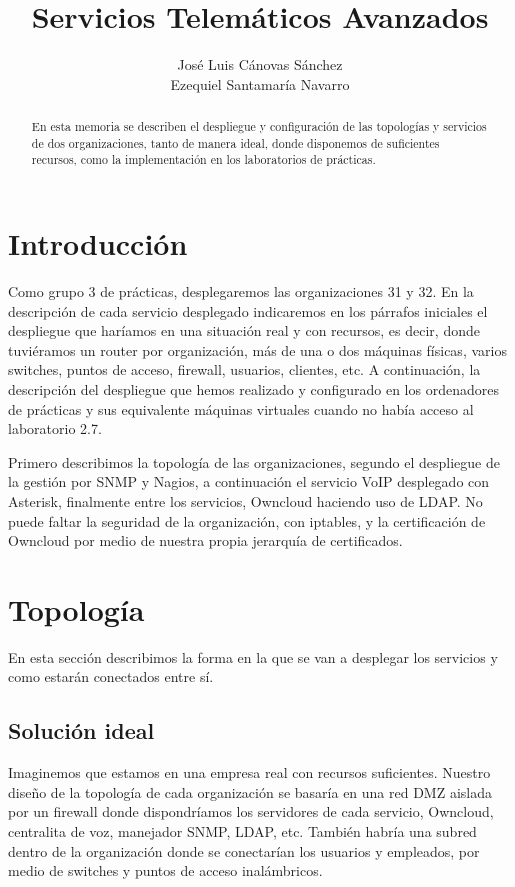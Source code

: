 \documentclass[]{article}
\title{Servicios Telemáticos Avanzados}
\author{José Luis Cánovas Sánchez\\Ezequiel Santamaría Navarro}
\begin{document}
\maketitle

\begin{abstract}
En esta memoria se describen el despliegue y configuración de las topologías y servicios de dos organizaciones, tanto de manera ideal, donde disponemos de suficientes recursos, como la implementación en los laboratorios de prácticas.
\end{abstract}

\tableofcontents


\section{Introducción}

Como grupo 3 de prácticas, desplegaremos las organizaciones 31 y 32. En la descripción de cada servicio desplegado indicaremos en los párrafos iniciales el despliegue que haríamos en una situación real y con recursos, es decir, donde tuviéramos un router por organización, más de una o dos máquinas físicas, varios switches, puntos de acceso, firewall, usuarios, clientes, etc. A continuación, la descripción del despliegue que hemos realizado y configurado en los ordenadores de prácticas y sus equivalente máquinas virtuales cuando no había acceso al laboratorio 2.7.

Primero describimos la topología de las organizaciones, segundo el despliegue de la gestión por SNMP y Nagios, a continuación el servicio VoIP desplegado con Asterisk, finalmente entre los servicios, Owncloud haciendo uso de LDAP. No puede faltar la seguridad de la organización, con iptables, y la certificación de Owncloud por medio de nuestra propia jerarquía de certificados.

\section{Topología}

En esta sección describimos la forma en la que se van a desplegar los servicios y como estarán
conectados entre sí.

\subsection{Solución ideal}

Imaginemos que estamos en una empresa real con recursos suficientes. Nuestro diseño de la topología de cada organización se basaría en una red DMZ aislada por un firewall donde dispondríamos los servidores de cada servicio, Owncloud, centralita de voz, manejador SNMP, LDAP, etc. También habría una subred dentro de la organización donde se conectarían los usuarios y empleados, por medio de switches y puntos de acceso inalámbricos.
\end{document}
